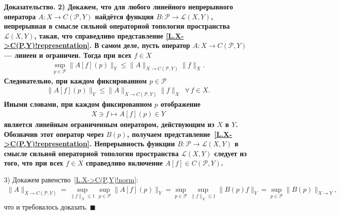 \documentclass{report}
\newenvironment{Proof}{\par\noindent\bf Доказательство.\rm}{ $\blacksquare$\par}
\begin{document}
\begin{Proof}
2) Докажем, что для любого линейного непрерывного оператора $A:X\to C(\mathcal{P},Y)$ найдётся функция $B:\mathcal{P}\to\mathcal{L}(X,Y)$, непрерывная в смысле сильной операторной топологии пространства $\mathcal{L}(X,Y)$, такая, что справедливо представление \eqref{L.X->C(P,Y)!representation}. В самом деле, пусть оператор $A:X\to C(\mathcal{P},Y)$ --- линеен и ограничен. Тогда при всех $f\in X$
\begin{gather*}
\sup\limits_{p\in\mathcal{P}}\|A[f](p)\|_Y\leqslant\|A\|_{X\to C(\mathcal{P},Y)}\|f\|_X.
\end{gather*}
Следовательно, при каждом фиксированном $p\in\mathcal{P}$
\begin{gather*}
\|A[f](p)\|_Y\leqslant\|A\|_{X\to C(\mathcal{P},Y)}\|f\|_X\,\,\,\forall\,f\in X.
\end{gather*}
Иными словами, при каждом фиксированном $p$ отображение
\begin{gather*}
X\ni f\mapsto A[f](p)\in Y
\end{gather*}
является линейным ограниченным оператором, действующим из $X$ в $Y$. Обозначив этот оператор через $B(p)$, получаем представление~\eqref{L.X->C(P,Y)!representation}. Непрерывность функции $B:\mathcal{P}\to\mathcal{L}(X,Y)$ в смысле сильной операторной топологии пространства $\mathcal{L}(X,Y)$ следует из того, что при всех $f\in X$ справедливо включение $A[f]\in C(\mathcal{P},Y)$.

3) Докажем равенство~\eqref{L.X->C(P,Y)!norm}:
\begin{gather*}
\|A\|_{X\to C(\mathcal{P},Y)}=\sup\limits_{\|f\|_X\leqslant1}\sup\limits_{p\in\mathcal{P}}\|A[f](p)\|_Y=\sup\limits_{p\in\mathcal{P}}\sup\limits_{\|f\|_X\leqslant1}\|B(p)f\|_Y=
\sup\limits_{p\in\mathcal{P}}\|B(p)\|_{X\to Y},
\end{gather*}
что и требовалось доказать.
\end{Proof}
\end{document}
